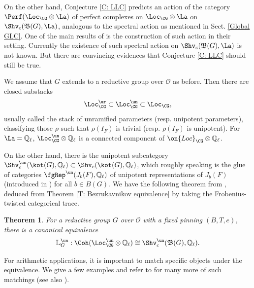 \documentclass[11pt]{amsart}
\newtheorem{thm}{Theorem}[subsection]
\theoremstyle{definition}
\theoremstyle{definition}
\theoremstyle{definition}
\numberwithin{equation}{section}
\newcommand{\frakB}{{\mathfrak B}}
\newcommand{\bL}{{\mathbb L}}
\newcommand{\bQ}{{\mathbb Q}}
\newcommand{\mO}{{\mathcal O}}
\begin{document}
On the other hand, Conjecture \ref{C: LLC} predicts an action of the category $\Perf(\Loc_{\CG}\otimes\La)$ of perfect complexes on $\Loc_{\CG}\otimes\La$ on $\Shv_c(\frakB(G),\La)$, analogous to the spectral action as mentioned in Sect. \ref{Global GLC}. One of the main results of \cite{Fargues-Scholze-Geometrization} is the construction of such action in their setting. 
Currently the existence of such spectral action on $\Shv_c(\frakB(G),\La)$ is not known. But there are convincing evidences that
Conjecture \ref{C: LLC} should still be true.

We assume that $G$ extends to a reductive group over $\mO$ as before. Then there are closed substacks 
\[\Loc_{\CG}^{\ur}\subset\Loc_{\CG}^{\un}\subset \Loc_{\CG},
\] 
usually called the stack of unramified parameters (resp. unipotent parameters), classifying those $\rho$ such that $\rho(I_F)$ is trivial (resp. $\rho(I_F)$ is unipotent).
For $\La=\bQ_\ell$, $\Loc_{\CG}^{\un}\otimes\bQ_\ell$ is a connected component of $\on{Loc}_{\CG}\otimes\bQ_\ell$. 

On the other hand, there is
the unipotent subcategory $\Shv_c^{\un}(\kot(G),\bQ_\ell)\subset \Shv_c(\kot(G),\bQ_\ell)$, which roughly speaking is the glue of categories $\fgRep^{\un}(J_b(F),\bQ_\ell)$ of unipotent representations of $J_b(F)$ (introduced in \cite{Lusztig-Unipotent}) for all $b\in B(G)$. We have the following theorem from \cite{Hemo-Zhu-Unipotent}, deduced from Theorem \ref{T: Bezrukavnikov equivalence} by taking the Frobenius-twisted categorical trace. 

\begin{thm}\label{T: tame local Langlands}
For a reductive group $G$ over $\mO$ with a fixed pinning $(B,T,e)$, there is a canonical equivalence
\[
\bL^{\un}_G:  \Coh(\Loc_{\CG}^{\un}\otimes\bQ_\ell)\cong  \Shv_{c}^{\un}(\frakB(G),\bQ_\ell).
\]
\end{thm}
For arithmetic applications, it is important to match specific objects under the equivalence. We give a few examples and refer to  \cite{Hemo-Zhu-Unipotent} for many more of such matchings (see also \cite[Sect. 4.3-4.5]{Zhu-Conjecture}).
\end{document}
